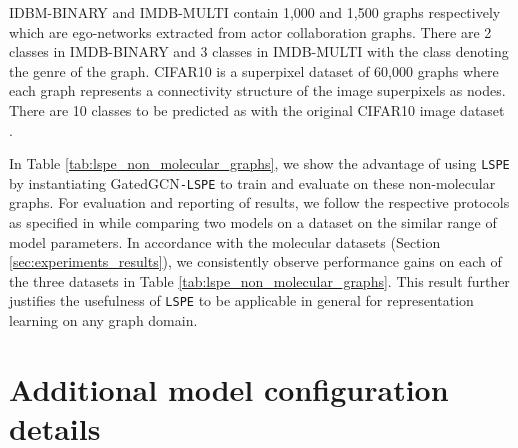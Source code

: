 \documentclass{article} \usepackage{iclr2021_conference,times}
\begin{document}
IDBM-BINARY and IMDB-MULTI contain 1,000 and 1,500 graphs respectively which are ego-networks extracted from actor collaboration graphs. There are 2 classes in IMDB-BINARY and 3 classes in IMDB-MULTI with the class denoting the genre of the graph. CIFAR10 is a superpixel dataset of 60,000 graphs where each graph represents a connectivity structure of the image superpixels as nodes. There are 10 classes to be predicted as with the original CIFAR10 image dataset \citep{krizhevsky2009learning}.


In Table \ref{tab:lspe_non_molecular_graphs}, we show the advantage of using \texttt{LSPE} by instantiating GatedGCN\texttt{-LSPE} to train and evaluate on these non-molecular graphs. For evaluation and reporting of results, we follow the respective protocols as specified in \cite{morris2020tudataset, dwivedi2020benchmarking} while comparing two models on a dataset on the similar range of model parameters. In accordance with the molecular datasets (Section \ref{sec:experiments_results}), we consistently observe performance gains on each of the three datasets in Table \ref{tab:lspe_non_molecular_graphs}. This result further justifies the usefulness of \texttt{LSPE} to be applicable in general for representation learning on any graph domain.








\section{Additional model configuration details}
\label{sec:supplementary_implementation}
\end{document}
